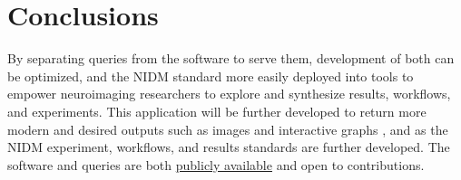 \documentclass[twocolumn]{bmcart}%
\begin{document}
\section{Conclusions}\label{conclusions}

By separating queries from the software to serve them, development of both can be optimized, and the NIDM standard more easily deployed into tools to empower neuroimaging researchers to explore and synthesize results, workflows, and experiments. This application will be further developed to return more modern and desired outputs such as images and interactive graphs \cite{noauthor_undated-fs}, and as the NIDM experiment, workflows, and results standards are further developed. The software and queries are both \href{https://github.com/incf-nidash}{publicly available} and open to contributions.

\end{document}
